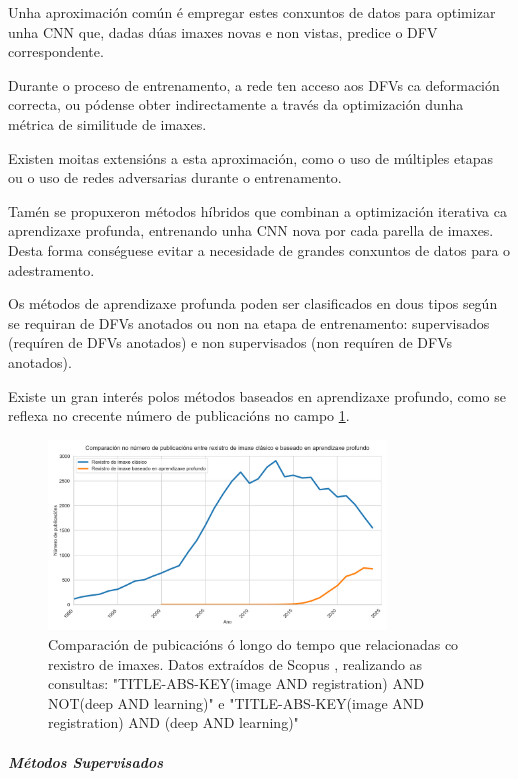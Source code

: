 Unha aproximación común é empregar estes conxuntos de datos para optimizar unha CNN que,
 dadas dúas imaxes novas e non vistas, predice o DFV correspondente. \cite{defregcnn}

Durante o proceso de entrenamento, a rede ten acceso aos DFVs ca deformación correcta,
 ou pódense obter indirectamente a través da optimización dunha métrica de similitude de imaxes.

Existen moitas extensións a esta aproximación, como o uso de múltiples etapas ou o uso de redes adversarias durante o entrenamento.

Tamén se propuxeron métodos híbridos que combinan a optimización iterativa ca aprendizaxe profunda, 
entrenando unha CNN nova por cada parella de imaxes. Desta forma conséguese evitar a necesidade de grandes conxuntos de datos para o adestramento.

Os métodos de aprendizaxe profunda poden ser clasificados en dous tipos según se requiran de DFVs anotados ou non na etapa de entrenamento: 
supervisados (requíren de DFVs anotados) e non supervisados (non requíren de DFVs anotados). \cite{nie2024medicalimageregistrationapplication}

Existe un gran interés polos métodos baseados en aprendizaxe profundo, como se reflexa no crecente número de publicacións no campo \ref{fig:method_comp}.

\begin{figure}[hp!]
    \centering
    \includegraphics[width=0.8\textwidth]{imaxes/methods_comp.png}
    \caption{Comparación de pubicacións ó longo do tempo que relacionadas co rexistro de imaxes. Datos extraídos de Scopus \cite{scopus}, realizando as consultas: "TITLE-ABS-KEY(image AND registration) AND NOT(deep AND learning)" e "TITLE-ABS-KEY(image AND registration) AND (deep AND learning)"}
    \label{fig:method_comp}
\end{figure}

\subparagraph{Métodos Supervisados}
\label{subparagraph:Métodos Supervisados}

